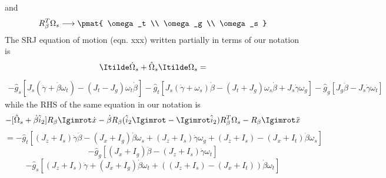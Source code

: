 \documentclass[11pt]{article}                %
\begin{document}
		and
		\begin{align}
			R_{\beta}^T \Omega_s \longrightarrow 
			 \pmat{  \omega_t  \\ \omega_g  \\  \omega_s }
		\end{align}
		The SRJ equation of motion (eqn. xxx) written partially in terms of our notation is
		\begin{align}
			\Itilde \dot{\Omega}_s + \hat{\Omega}_s \Itilde \Omega_s = 
		\end{align}
		\begin{align}
			- \hat{g}_s [ J_s (\ddot{\gamma} + \dot{\beta} \omega_t)  - (J_t - J_g) \omega_t 
			   \dot{\beta} ]
			   - \hat{g}_t [ J_s( \dot{\gamma} + \omega_s) \dot{\beta} - (J_t + J_g)
			   \omega_s \dot{\beta}  + J_s \dot{\gamma} \omega_g ] 
			   - \hat{g}_g [ J_g \ddot{\beta}  -  J_s \dot{\gamma} \omega_t ]
		\end{align}
		while the RHS of the same equation in our notation is
		\[
		     - [ \hat{\Omega}_s + \dot{\beta} \hat{i}_2 ]  R_{\beta} \Igimrot \dot{x}
		     - \dot{\beta} R_{\beta} ( \hat{i}_2 \Igimrot - \Igimrot \hat{i}_2 ) R_{\beta}^T \Omega_s
		     - R_{\beta} \Igimrot \ddot{x}
		\]
		\[
		=  - \hat{g}_t [ (J_z + I_s) \dot{\gamma} \dot{\beta}  - (J_x + I_g) \dot{\beta} \omega_s
		   + (J_z + I_s) \dot{\gamma} \omega_g + (J_z + I_s)  - (J_x + I_t) \dot{\beta} \omega_s]
		   \]
		 \[
		 - \hat{g}_g [ (J_x + I_g) \ddot{\beta} - (J_z + I_s) \dot{\gamma} \omega_t ] 		   
		\] 
		\[
		 - \hat{g}_s [ (J_z + I_s) \ddot{\gamma}  + (J_x + I_g) \dot{\beta} \omega_t  + 
		 ((J_z + I_s) - (J_x + I_t) ) \dot{\beta} \omega_t ]
		 \]
		
			
\end{document}
